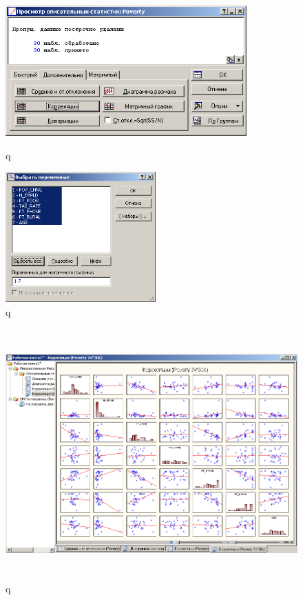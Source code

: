 \begin{figure}[!h]
  \centering
  \begin{minipage}{0.49\textwidth}
    \centering

    \includegraphics[height=5cm]
    {inc/example_16.PNG}

    \caption{q}
    \label{fig:example_16}
  \end{minipage}
  \begin{minipage}{0.49\textwidth}
    \centering

    \includegraphics[height=5cm]
    {inc/example_17.PNG}

    \caption{q}
    \label{fig:example_17}
  \end{minipage}
\end{figure}

\begin{figure}[!h]
  \centering

  \includegraphics[height=9.6cm]
  {inc/example_18.PNG}

  \caption{q}

  \label{fig:example_18}
\end{figure}

